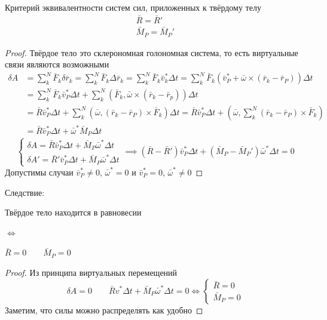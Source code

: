 \documentclass[crop=false]{standalone}
\begin{document}
\keypoint Критерий эквивалентности систем сил, приложенных к твёрдому телу
\[\boxed{\begin{matrix}\bar R = \bar R' \\ \bar M_P = \bar M_P'\end{matrix}}\]
\begin{proof}
    Твёрдое тело это склерономная голономная система, то есть виртуальные связи являются возможными
\[
\begin{aligned} 
    \delta A &= \sum_k^N \bar F_k \delta \bar r_k = \sum_k^N \bar F_k \Delta \bar r_k = \sum_k^N \bar F_k \bar v_k^* \Delta t = \sum_k^N \bar F_k (\bar v_P^* + \bar \omega \times (\bar r_k - \bar r_P)) \Delta t \\
    &= \sum_k^N \bar F_k \bar v_P^* \Delta t + \sum_k^N \left( \bar F_k ,\bar \omega \times (\bar r_k - \bar r_p)  \right)\Delta t  \\
    &= \bar R \bar v_P^* \Delta t + \sum_k^N (\bar \omega, (\bar r_k - \bar r_P) \times \bar F_k) \Delta t = \bar R \bar v_P^* \Delta t + \left(\bar \omega , \sum_k^N (\bar r_k - \bar r_P) \times \bar F_k \right) \\
    &= \bar R \bar v_P^* \Delta t + \bar \omega^* \bar M_P \Delta t 
\end{aligned}
\]
\[
    \begin{cases}
        \delta A = \bar R \bar v_P^* \Delta t + \bar M_P \bar \omega^* \Delta t \\ \delta A' = \bar R' \bar v_P^* \Delta t + \bar M_P \bar \omega^* \Delta t 
    \end{cases} \implies \boxed{(\bar R - \bar R') \bar v_P^* \Delta t + (\bar M_P - \bar M_P') \bar \omega^* \Delta t = 0}
    \]
    Допустимы случаи $\bar v_P^* \neq 0$, $\bar \omega^* = 0$ и $\bar v_P^* = 0$, $\bar \omega^* \neq 0$
\end{proof}

Следствие: 

Твёрдое тело находится в равновесии 

$\iff$

$\bar R = 0 \qquad  \bar M_P = 0$
\begin{proof}
    Из принципа виртуальных перемещений 
    \[\delta A = 0 \qquad \bar R v^* \Delta t + \bar M_P \bar \omega^* \Delta t = 0 \iff \begin{cases}
        \bar R = 0 \\ 
        \bar M_P = 0
    \end{cases}\]
    Заметим, что силы можно распределять как удобно %
\end{proof}
\end{document}
